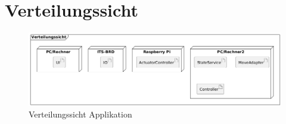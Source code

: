 \chapter{Verteilungssicht}
\begin{figure}[h!]
	\centering
	\includegraphics[scale=.5]{diagrams/Verteilungssicht.png}
	\caption{Verteilungssicht Applikation}
	\label{fig:deployment-prod-grafik}
\end{figure}




